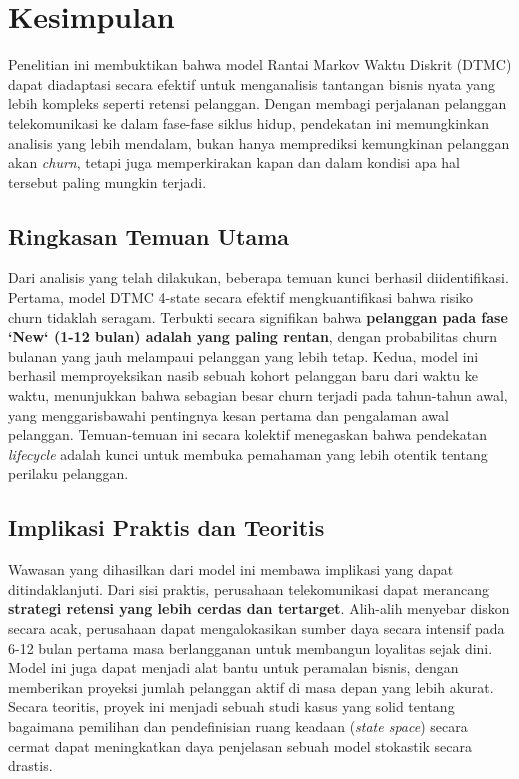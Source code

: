 \documentclass[a4paper,12pt]{article}
\begin{document}
\section{Kesimpulan}
Penelitian ini membuktikan bahwa model Rantai Markov Waktu Diskrit (DTMC) dapat diadaptasi secara efektif untuk menganalisis tantangan bisnis nyata yang lebih kompleks seperti retensi pelanggan. Dengan membagi perjalanan pelanggan telekomunikasi ke dalam fase-fase siklus hidup, pendekatan ini memungkinkan analisis yang lebih mendalam, bukan hanya memprediksi kemungkinan pelanggan akan \textit{churn}, tetapi juga memperkirakan kapan dan dalam kondisi apa hal tersebut paling mungkin terjadi.

\subsection*{Ringkasan Temuan Utama}
Dari analisis yang telah dilakukan, beberapa temuan kunci berhasil diidentifikasi. Pertama, model DTMC 4-state secara efektif mengkuantifikasi bahwa risiko churn tidaklah seragam. Terbukti secara signifikan bahwa \textbf{pelanggan pada fase `New` (1-12 bulan) adalah yang paling rentan}, dengan probabilitas churn bulanan yang jauh melampaui pelanggan yang lebih tetap. Kedua, model ini berhasil memproyeksikan nasib sebuah kohort pelanggan baru dari waktu ke waktu, menunjukkan bahwa sebagian besar churn terjadi pada tahun-tahun awal, yang menggarisbawahi pentingnya kesan pertama dan pengalaman awal pelanggan. Temuan-temuan ini secara kolektif menegaskan bahwa pendekatan \textit{lifecycle} adalah kunci untuk membuka pemahaman yang lebih otentik tentang perilaku pelanggan.

\subsection*{Implikasi Praktis dan Teoritis}
Wawasan yang dihasilkan dari model ini membawa implikasi yang dapat ditindaklanjuti. Dari sisi praktis, perusahaan telekomunikasi dapat merancang \textbf{strategi retensi yang lebih cerdas dan tertarget}. Alih-alih menyebar diskon secara acak, perusahaan dapat mengalokasikan sumber daya secara intensif pada 6-12 bulan pertama masa berlangganan untuk membangun loyalitas sejak dini. Model ini juga dapat menjadi alat bantu untuk peramalan bisnis, dengan memberikan proyeksi jumlah pelanggan aktif di masa depan yang lebih akurat. Secara teoritis, proyek ini menjadi sebuah studi kasus yang solid tentang bagaimana pemilihan dan pendefinisian ruang keadaan (\textit{state space}) secara cermat dapat meningkatkan daya penjelasan sebuah model stokastik secara drastis.
\end{document}
